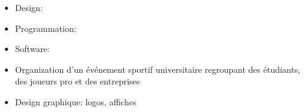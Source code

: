 



\begin{itemize}
	\item Design: \\ \medskip
	\item Programmation: \\ \medskip
	\item Software: \\ \medskip
	\cvtag{\LaTeX}
\end{itemize}

\medskip
\medskip
\medskip
\medskip
\medskip

\divider
{}
\divider
{}
\divider
{}

\medskip
\medskip
\medskip
\medskip
\medskip

\begin{itemize}
	\item Organization d'un événement sportif universitaire regroupant des étudiants, des joueurs pro et des entreprises
\end{itemize}
\divider
\divider
{}
\begin{itemize}
	\item Design graphique: logos, affiches
\end{itemize}
